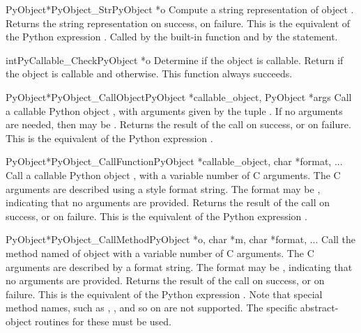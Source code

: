 \documentclass{manual}
\begin{document}
\begin{cfuncdesc}{PyObject*}{PyObject_Str}{PyObject *o}
Compute a string representation of object .  Returns the
string representation on success, \NULL{} on failure.  This is
the equivalent of the Python expression .
Called by the  built-in function and
by the  statement.
\end{cfuncdesc}


\begin{cfuncdesc}{int}{PyCallable_Check}{PyObject *o}
Determine if the object  is callable.  Return  if the
object is callable and  otherwise.
This function always succeeds.
\end{cfuncdesc}


\begin{cfuncdesc}{PyObject*}{PyObject_CallObject}{PyObject *callable_object,
                                                  PyObject *args}
Call a callable Python object , with
arguments given by the tuple .  If no arguments are
needed, then  may be \NULL{}.  Returns the result of the
call on success, or \NULL{} on failure.  This is the equivalent
of the Python expression .
\end{cfuncdesc}

\begin{cfuncdesc}{PyObject*}{PyObject_CallFunction}{PyObject *callable_object, char *format, ...}
Call a callable Python object , with a
variable number of C arguments. The C arguments are described
using a  style format string. The format may
be \NULL{}, indicating that no arguments are provided.  Returns the
result of the call on success, or \NULL{} on failure.  This is
the equivalent of the Python expression .
\end{cfuncdesc}


\begin{cfuncdesc}{PyObject*}{PyObject_CallMethod}{PyObject *o, char *m, char *format, ...}
Call the method named  of object  with a variable number
of C arguments.  The C arguments are described by a
 format string.  The format may be \NULL{},
indicating that no arguments are provided. Returns the result of the
call on success, or \NULL{} on failure.  This is the equivalent of the
Python expression .
Note that special method names, such as ,
, and so on are not supported.  The specific
abstract-object routines for these must be used.
\end{cfuncdesc}
\end{document}
